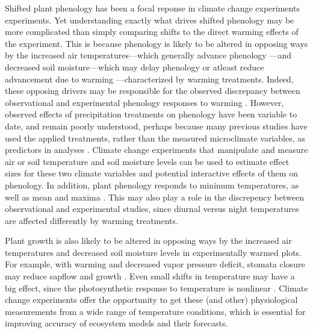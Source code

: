\documentclass{article}
\begin{document}
\par Shifted plant phenology has been a focal reponse in climate change experiments experiments. Yet understanding exactly what drives shifted phenology may be more complicated than simply comparing shifts to the direct warming effects of the experiment. This is because phenology is likely to be altered in opposing ways by the increased air temperatures---which generally advance phenology \citep{wolkovich2012}---and decreased soil moisture---which may delay phenology or atleast reduce advancement due to warming \citep{penuelas2004,craine2012,matthews2016}---characterized by warming treatments. Indeed, these opposing drivers may be responsible for the observed discrepancy between observational and experimental phenology responses to warming \citep{wolkovich2012}. However, observed effects of precipitation treatments on phenology have been variable to date, and remain poorly understood, perhaps because many previous studies have used the applied treatments, rather than the measured microclimate variables, as predictors in analyses \citep[but see][]{morin2010}. Climate change experiments that manipulate and measure air or soil temperature and soil moisture levels can be used to estimate effect sizes for these two climate variables and potential interactive effects of them on phenology. In addition, plant phenology responds to minimum temperatures, as well as mean and maxima \citep{shen2016,fu2016,piao2015}. This may also play a role in the discrepency between observational and experimental studies, since diurnal versus night temperatures are affected differently by warming treatments\citep{shen2016,matthews2016}. 
\par Plant growth is also likely to be altered in opposing ways by the increased air temperatures and decreased soil moisture levels in experimentally warmed plots. For example, with warming and decreased vapor pressure deficit, stomata closure may reduce sapflow and growth \citep{templer2016}. Even small shifts in temperature may have a big effect, since the photosynthetic response to temperature is nonlinear \citep{berry1980}. Climate change experiments offer the opportunity to get these (and other) physiological measurements from a wide range of temperature conditions, which is essential for improving accuracy of ecosystem models and their forecasts.  %
\end{document}

